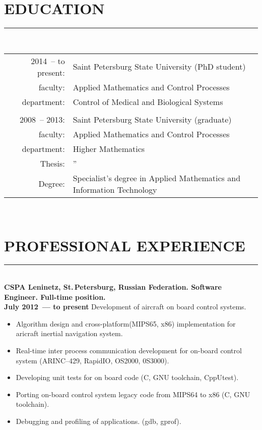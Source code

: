 \documentclass[a4paper,oneside,12pt]{article}
\newcommand{\cvpart}[1]{%
\vspace{-0.9em}%
\section*{\Large\bfseries\MakeTextUppercase{#1}}%
\vspace{-1.7em}%
\rule{\linewidth}{0.3em}\\[-0.8em]%
}
\begin{document}
\pagebreak

\cvpart{Education}

\begin{tabularx}{\linewidth}{rX}
2014~-- to present:& Saint Petersburg State University (PhD student)\\
           faculty:& Applied Mathematics and Control Processes\\
        department:& Control of Medical and Biological Systems\\
                   & \\
      2008~-- 2013:& Saint Petersburg State University (graduate)\\
           faculty:& Applied Mathematics and Control Processes\\
        department:& Higher Mathematics\\
            Thesis:& ''\\ %
            Degree:& Specialist's degree in Applied Mathematics and Information Technology
\end{tabularx}

~\\

\cvpart{Professional Experience}

{\bf
CSPA Leninetz, St.\,Petersburg, Russian Federation. Software Engineer. Full-time position.\\
July 2012~--- to present
}
Development of aircraft on board control systems.

\begin{itemize}
    \item Algorithm design and cross-platform(MIPS65, x86)  implementation for aricraft inertial navigation system.
\item Real-time inter process communication development for on-board control system (ARINC--429, RapidIO, OS2000, 0S3000).
\item Developing unit tests for on board code (C, GNU toolchain, CppUtest).     
\item Porting on-board control system legacy code from MIPS64 to x86 (C, GNU toolchain).
\item Debugging and profiling of applications. (gdb, gprof).
\end{itemize}

~\\[-1em]
\end{document}
